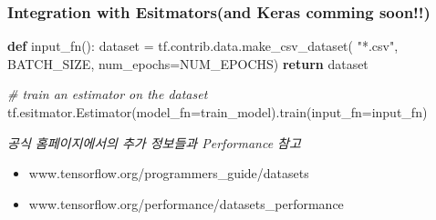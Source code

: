 \documentclass[11pt]{article}
\providecommand{\tightlist}{%
      \setlength{\itemsep}{0pt}\setlength{\parskip}{0pt}}
\newenvironment{Shaded}{}{}
\newcommand{\KeywordTok}[1]{\textcolor[rgb]{0.00,0.44,0.13}{\textbf{{#1}}}}
\newcommand{\StringTok}[1]{\textcolor[rgb]{0.25,0.44,0.63}{{#1}}}
\newcommand{\CommentTok}[1]{\textcolor[rgb]{0.38,0.63,0.69}{\textit{{#1}}}}
\newcommand{\NormalTok}[1]{{#1}}
\newcommand{\ControlFlowTok}[1]{\textcolor[rgb]{0.00,0.44,0.13}{\textbf{{#1}}}}
\newcommand{\OperatorTok}[1]{\textcolor[rgb]{0.40,0.40,0.40}{{#1}}}
\begin{document}
\begin{Shaded}
\end{Shaded}

\hypertarget{integration-with-esitmatorsand-keras-comming-soon}{%
\subsubsection{Integration with Esitmators(and Keras comming
soon!!)}\label{integration-with-esitmatorsand-keras-comming-soon}}

\begin{Shaded}
\begin{Highlighting}[]
\KeywordTok{def}\NormalTok{ input_fn():}
\NormalTok{    dataset }\OperatorTok{=}\NormalTok{ tf.contrib.data.make_csv_dataset(}
        \StringTok{"*.csv"}\NormalTok{, BATCH_SIZE, num_epochs}\OperatorTok{=}\NormalTok{NUM_EPOCHS)}
    \ControlFlowTok{return}\NormalTok{ dataset}

\CommentTok{# train an estimator on the dataset}
\NormalTok{tf.esitmator.Estimator(model_fn}\OperatorTok{=}\NormalTok{train_model).train(input_fn}\OperatorTok{=}\NormalTok{input_fn)}
\end{Highlighting}
\end{Shaded}

\emph{공식 홈페이지에서의 추가 정보들과 Performance 참고}

\begin{itemize}
\tightlist
\item
  www.tensorflow.org/programmers\_guide/datasets
\item
  www.tensorflow.org/performance/datasets\_performance
\end{itemize}
\end{document}

